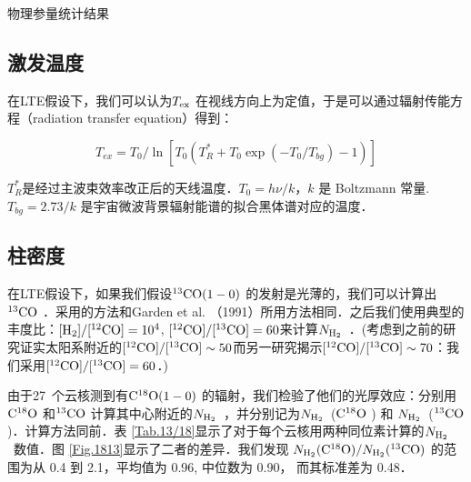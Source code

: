 \documentclass[UTF8, nocolorlinks]{pkuthss}
\newcommand{\cob}{$\rm ^{13}CO$ }
\newcommand{\coc}{$\rm C^{18}O$ }
\newcommand{\cobb}{$\rm^{13}CO(1-0)$ }
\newcommand{\cocc}{$\rm C^{18}O(1-0)$ }
\newcommand{\texc}{$T_{\rm {ex}}$ }
\newcommand{\nhyd}{$N_{\rm H_2}$\ }
\newcommand{\numcompofcores}{27\ }
\begin{document}
		\begin{table}
			\begin{footnotesize}
	        \begin{center}
	        \caption{物理参量统计结果\label{Tab.PhysicalParaStat}}

	        \setlength{\tabcolsep}{0.04in}
	        \vspace{0.5em}

	        

	        \end{center}
	        \end{footnotesize}
        \end{table}

        \subsection{激发温度}

	        在LTE假设下，我们可以认为\texc 在视线方向上为定值，于是可以通过辐射传能方程（radiation transfer equation）得到：

		    \begin{equation}
		    	T_{ex} = T_0 / \ln[T_0 (T^*_R + T_0 \exp{(-T_0/T_{bg})}-1)]
		    \end{equation}

		    $T^*_R$是经过主波束效率改正后的天线温度．$T_0 = h\nu /k$，$k$ 是 Boltzmann 常量. $T_{bg} = 2.73 /k$ 是宇宙微波背景辐射能谱的拟合黑体谱对应的温度．

		\subsection{柱密度}

			在LTE假设下，如果我们假设\cobb 的发射是光薄的，我们可以计算出\cob ．采用的方法和Garden et al. （1991）所用方法相同\supercite{1991ApJ...374..540G}．之后我们使用典型的丰度比：$\rm [H_2]/[ ^{12}CO]=10^4$,  $\rm [^{12}CO]/[^{13}CO]=60$来计算\nhyd．(考虑到之前的研究\supercite{1987ApJ...317..926H}证实太阳系附近的$\rm [^{12}CO]/[^{13}CO]\sim 50$而另一研究\supercite{1980Sci...208..663P}揭示$\rm [^{12}CO]/[^{13}CO]\sim 70$：我们采用$\rm [^{12}CO]/[^{13}CO]=60$．)

			由于\numcompofcores 个云核测到有\cocc 的辐射，我们检验了他们的光厚效应：分别用\coc 和\cob 计算其中心附近的\nhyd，并分别记为\nhyd(\coc) 和 \nhyd(\cob)．计算方法同前\supercite{1991ApJ...374..540G}．表 \ref{Tab.13/18}显示了对于每个云核用两种同位素计算的\nhyd 数值．图 \ref{Fig.1813}显示了二者的差异．我们发现 ${N_{\rm H_2}(\rm C^{18}O)}/{ N_{\rm H_2}(\rm ^{13}CO)}$ 的范围为从 0.4 到 2.1，平均值为 0.96, 中位数为 0.90， 而其标准差为 0.48．
\end{document}
